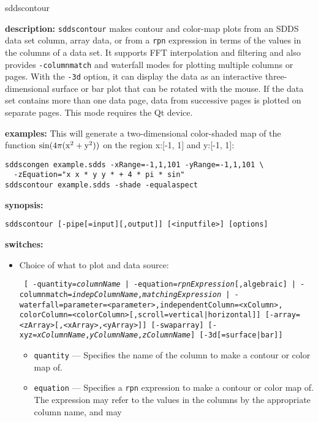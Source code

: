 \begin{sddsprog}{sddscontour}
  \item \textbf{description:}
  \verb|sddscontour| makes contour and color-map plots from an SDDS data set column, array data, or from a \verb|rpn| expression
  in terms of the values in the columns of a data set. It supports FFT interpolation and filtering and also provides
  \verb|-columnmatch| and waterfall modes for plotting multiple columns or pages. With the \verb|-3d| option, it
  can display the data as an interactive three-dimensional surface or bar plot that can be rotated with the mouse.
  If the data set contains more than one data page, data from successive pages is plotted on separate pages. This mode
  requires the Qt device.

  \item \textbf{examples:}
  This will generate a two-dimensional color-shaded map of the function ${\rm sin(4\pi (x^2 + y^2))}$ on
  the region x:[-1, 1] and y:[-1, 1]:
  \begin{verbatim}
sddscongen example.sdds -xRange=-1,1,101 -yRange=-1,1,101 \
  -zEquation="x x * y y * + 4 * pi * sin"
sddscontour example.sdds -shade -equalaspect
  \end{verbatim}
  \item \textbf{synopsis:}
  \begin{verbatim}
sddscontour [-pipe[=input][,output]] [<inputfile>] [options]
  \end{verbatim}
  \item \textbf{switches:}
    \begin{itemize}
    \item Choice of what to plot and data source:
\begin{flushleft}{\tt
[{ -quantity={\em columnName} | -equation={\em rpnExpression}[,algebraic] |
  -columnmatch={\em indepColumnName},{\em matchingExpression}} |
 -waterfall=parameter=<parameter>,independentColumn=<xColumn>,
             colorColumn=<colorColumn>[,scroll=vertical|horizontal]]
[-array=<zArray>[,<xArray>,<yArray>]] [-swaparray]
[-xyz={\em xColumnName},{\em yColumnName},{\em zColumnName}]
[-3d[=surface|bar]]
}\end{flushleft}
\begin{itemize}
        \item \verb|quantity| --- Specifies the name of the column to make a contour or color map of.
        \item \verb|equation| --- Specifies a \verb|rpn| expression to make a contour or color map of.
        The expression may refer to the values in the columns by the appropriate column name, and may

\end{itemize}
\end{itemize}
\end{sddsprog}
